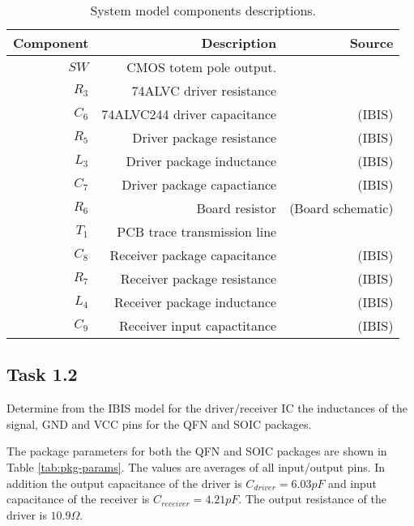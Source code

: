 \documentclass[../main.tex]{subfiles}
\begin{document}
\newpage

\begin{table}[h]
    \centering
    \begin{tabular}{r|r r}
        \toprule[1pt]
        \textbf{Component} & \textbf{Description} & \textbf{Source}\\
        \midrule
        $SW$    & CMOS totem pole output.       & \\
        $R_3$   & 74ALVC driver resistance      & \\
        $C_6$   & 74ALVC244 driver capacitance  & (IBIS) \\
        $R_5$   & Driver package resistance     & (IBIS) \\
        $L_3$   & Driver package inductance     & (IBIS) \\
        $C_7$   & Driver package capactiance    & (IBIS) \\
        $R_6$   & Board resistor                & (Board schematic)\\
        $T_1$   & PCB trace transmission line   & \\
        $C_8$   & Receiver package capacitance  & (IBIS) \\
        $R_7$   & Receiver package resistance   & (IBIS) \\
        $L_4$   & Receiver package inductance   & (IBIS) \\
        $C_9$   & Receiver input capactitance   & (IBIS) \\
        \bottomrule[1pt]
    \end{tabular}
    \caption{System model components descriptions.}
    \label{tab:driver}
\end{table}

\subsection{Task 1.2}

Determine from the IBIS model for the driver/receiver IC the inductances of the signal, GND and VCC pins for the QFN and SOIC packages.

\solution

The package parameters for both the QFN and SOIC packages are shown in Table \ref{tab:pkg-params}. The values are averages of all input/output pins. In addition the output capacitance of the driver is $C_{driver} = 6.03 \si{pF}$ and input capacitance of the receiver is $C_{receiver} = 4.21 \si{pF}$. The output resistance of the driver is $10.9\si{\Omega}$.
\end{document}
